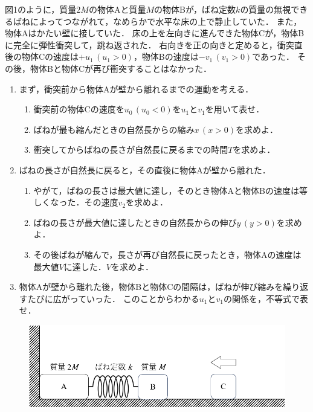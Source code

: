 図1のように，質量$2M$の物体Aと質量$M$の物体Bが，ばね定数$k$の質量の無視できるばねによってつながれて，なめらかで水平な床の上で静止していた．
また，物体Aはかたい壁に接していた．
床の上を左向きに進んできた物体Cが，物体Bに完全に弾性衝突して，跳ね返された．
右向きを正の向きと定めると，衝突直後の物体Cの速度は$+u_1\,(u_1>0)$，物体Bの速度は$-v_1\,(v_1>0)$であった．
その後，物体Bと物体Cが再び衝突することはなかった．

\begin{enumerate}[I]
  \setlength{\leftskip}{-2zw}
  \setlength{\itemindent}{1zw}\setlength{\labelsep}{0.5zw}
  \setlength{\labelwidth}{1zw}\setlength{\leftmargin}{1zw}
  \setlength{\itemsep}{0.5\baselineskip}
  \item まず，衝突前から物体Aが壁から離れるまでの運動を考える．
  \begin{enumerate}[（1）]
    \setlength{\leftskip}{-2.5zw}
    \setlength{\itemindent}{1zw}\setlength{\labelsep}{1zw}
    \setlength{\labelwidth}{1zw}
    \item 衝突前の物体Cの速度を$u_0\,(u_0<0)$を$u_1$と$v_1$を用いて表せ．
    \item ばねが最も縮んだときの自然長からの縮み$x\,(x>0)$を求めよ．
    \item 衝突してからばねの長さが自然長に戻るまでの時間$T$を求めよ．
  \end{enumerate}
  \item ばねの長さが自然長に戻ると，その直後に物体Aが壁から離れた．
  \begin{enumerate}[（1）]
    \setlength{\leftskip}{-2.5zw}
    \setlength{\itemindent}{1zw}\setlength{\labelsep}{1zw}
    \setlength{\labelwidth}{1zw}
    \item やがて，ばねの長さは最大値に達し，そのとき物体Aと物体Bの速度は等しくなった．その速度$v_2$を求めよ．
    \item ばねの長さが最大値に達したときの自然長からの伸び$y\,(y>0)$を求めよ．
    \item その後ばねが縮んで，長さが再び自然長に戻ったとき，物体Aの速度は最大値$V$に達した．$V$を求めよ．
  \end{enumerate}
  \item 物体Aが壁から離れた後，物体Bと物体Cの間隔は，ばねが伸び縮みを繰り返すたびに広がっていった．
  このことからわかる$u_1$と$v_1$の関係を，不等式で表せ．
\end{enumerate}



\begin{figure}[htbp]
  \centering
  \includegraphics[width=.8\columnwidth]{../graphs/todai_03-1.png}
  \caption{}
\end{figure}


